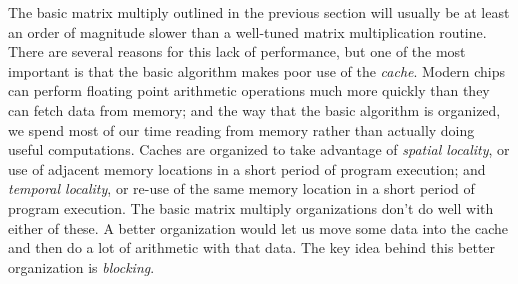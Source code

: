 \documentclass[12pt, leqno]{article}
\begin{document}
The basic matrix multiply outlined in the previous section will
usually be at least an order of magnitude slower than a well-tuned
matrix multiplication routine.  There are several reasons for this
lack of performance, but one of the most important is that the basic
algorithm makes poor use of the {\em cache}.
Modern chips can perform floating point arithmetic operations much
more quickly than they can fetch data from memory; and the way that
the basic algorithm is organized, we spend most of our time reading
from memory rather than actually doing useful computations.
Caches are organized to take advantage of {\em spatial locality},
or use of adjacent memory locations in a short period of program execution;
and {\em temporal locality}, or re-use of the same memory location in a
short period of program execution.  The basic matrix multiply organizations
don't do well with either of these.
A better organization would let us move some data into the cache
and then do a lot of arithmetic with that data.  The key idea behind
this better organization is {\em blocking}.
\end{document}
